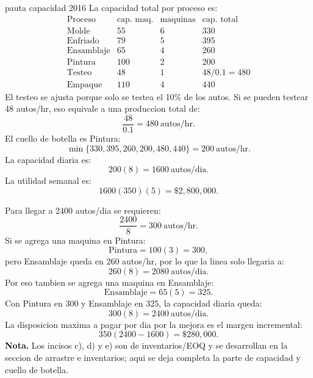 \begin{pautacompleta}{pauta capacidad 2016}
La capacidad total por proceso es:
\[
\begin{array}{l|ccc}
\text{Proceso} & \text{cap. maq.} & \text{maquinas} & \text{cap. total}\\
\hline
\text{Molde} &55&6&330\\
\text{Enfriado} &79&5&395\\
\text{Ensamblaje} &65&4&260\\
\text{Pintura} &100&2&200\\
\text{Testeo} &48&1&48/0.1=480\\
\text{Empaque} &110&4&440
\end{array}
\]
El testeo se ajusta porque solo se testea el 10\% de los autos. Si se pueden testear 48 autos/hr, eso equivale a una produccion total de:
\[
  \frac{48}{0.1}=480\ \text{autos/hr}.
\]
El cuello de botella es Pintura:
\[
  \min\{330,395,260,200,480,440\}=200\ \text{autos/hr}.
\]
La capacidad diaria es:
\[
  200(8)=1600\ \text{autos/dia}.
\]
La utilidad semanal es:
\[
  1600(350)(5)=\$2{,}800{,}000.
\]

Para llegar a 2400 autos/dia se requieren:
\[
  \frac{2400}{8}=300\ \text{autos/hr}.
\]
Si se agrega una maquina en Pintura:
\[
  \text{Pintura}=100(3)=300,
\]
pero Ensamblaje queda en 260 autos/hr, por lo que la linea solo llegaria a:
\[
  260(8)=2080\ \text{autos/dia}.
\]
Por eso tambien se agrega una maquina en Ensamblaje:
\[
  \text{Ensamblaje}=65(5)=325.
\]
Con Pintura en 300 y Ensamblaje en 325, la capacidad diaria queda:
\[
  300(8)=2400\ \text{autos/dia}.
\]
La disposicion maxima a pagar por dia por la mejora es el margen incremental:
\[
  350(2400-1600)=\$280{,}000.
\]
\textbf{Nota.} Los incisos c), d) y e) son de inventarios/EOQ y se desarrollan en la seccion de arrastre e inventarios; aqui se deja completa la parte de capacidad y cuello de botella.
\end{pautacompleta}

